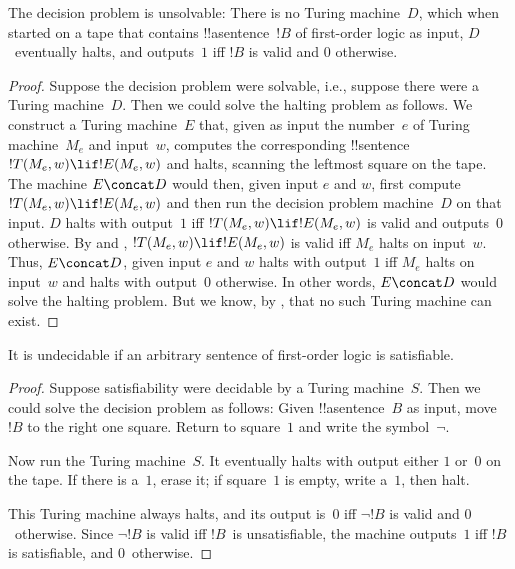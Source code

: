 \documentclass[../../../include/open-logic-section]{subfiles}
\begin{document}

\begin{thm}
The decision problem is unsolvable: There is no Turing machine~$D$,
which when started on a tape that contains !!a{sentence}~$!B$ of
first-order logic as input, $D$~eventually halts, and outputs~$1$ iff
$!B$ is valid and $0$ otherwise.
\end{thm}

\begin{proof}
Suppose the decision problem were solvable, i.e., suppose there were a
Turing machine~$D$. Then we could solve the halting problem as
follows. We construct a Turing machine~$E$ that, given as input the
number~$e$ of Turing machine~$M_e$ and input~$w$, computes the
corresponding !!{sentence}~$!T(M_e, w) \lif !E(M_e, w)$ and halts,
scanning the leftmost square on the tape.  The machine $E \concat D$
would then, given input $e$ and $w$, first compute~$!T(M_e, w) \lif
!E(M_e, w)$ and then run the decision problem machine~$D$ on that
input.  $D$ halts with output~$1$ iff $!T(M_e, w) \lif !E(M_e, w)$ is
valid and outputs~$0$ otherwise. By  and
, $!T(M_e, w) \lif !E(M_e, w)$ is valid
iff $M_e$ halts on input~$w$. Thus, $E\concat D$, given input $e$ and
$w$ halts with output~$1$ iff $M_e$ halts on input~$w$ and halts with
output~$0$ otherwise. In other words, $E \concat D$ would solve the
halting problem.  But we know, by ,
that no such Turing machine can exist.
\end{proof}

\begin{cor}
It is undecidable if an arbitrary sentence of first-order logic is satisfiable.
\end{cor}

\begin{proof}
  Suppose satisfiability were decidable by a Turing machine~$S$. Then
  we could solve the decision problem as follows: Given
  !!a{sentence}~$B$ as input, move $!B$ to the right one square.
  Return to square~$1$ and write the symbol~$\lnot$.

  Now run the Turing machine~$S$. It eventually halts with output
  either $1$ or~$0$ on the tape. If there is a~$1$, erase it; if
  square~$1$ is empty, write a~$1$, then halt.

  This Turing machine always halts, and its output is~$0$ iff $\lnot
  !B$ is valid and $0$~otherwise. Since $\lnot !B$ is valid iff
  $!B$~is unsatisfiable, the machine outputs~$1$ iff $!B$ is
  satisfiable, and $0$~otherwise.
\end{proof}
\end{document}
